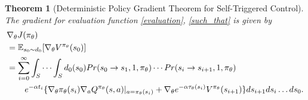 \documentclass[english, dvipdfmx]{ampmt}             %
\newcommand{\expect}{\mathbb{E}}
\newtheorem{th.}{Theorem}
\begin{document}
\begin{th.}[Deterministic Policy Gradient Theorem for Self-Triggered Control]
The gradient for evaluation function \eqref{evaluation}, \eqref{such_that} is given by
\begin{align}
	&\nabla_{\theta}J(\pi_{\theta})\nonumber \\
	&= \expect_{s_0\sim d_0}[\nabla_{\theta}V^{\pi_{\theta}}(s_0)]\nonumber\\
	&= \sum_{i=0}^{\infty}\int_{S}\cdots\int_{S}d_0(s_0)Pr(s_0\to s_1,1,\pi_{\theta})\cdots Pr(s_{i}\to s_{i+1},1,\pi_{\theta})\nonumber\\
	&\hspace{5ex}e^{-\alpha t_i}\{\nabla_{\theta}\pi_{\theta}(s_i)\nabla_aQ^{\pi_{\theta}}(s,a)|_{a=\pi_{\theta}(s_i)} + \nabla_{\theta}e^{-\alpha\tau_{\theta}(s_{i})}V^{\pi_{\theta}}(s_{i+1})\}ds_{i+1}ds_{i}\ldots ds_0. \label{PG_for_STC}
\end{align}
\end{th.}
\end{document}
